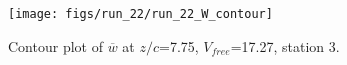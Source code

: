 \begin{figure}[H]
\centering
\texttt{[image: figs/run\_22/run\_22\_W\_contour]}
\caption{Contour plot of $\overline{w}$ at $z/c$=7.75, $V_{free}$=17.27, station 3.}
\label{fig:run_22_W_contour}
\end{figure}



